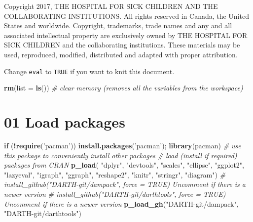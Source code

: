 \documentclass[
]{article}
\newenvironment{Shaded}{\begin{snugshade}}{\end{snugshade}}
\newcommand{\CommentTok}[1]{\textcolor[rgb]{0.56,0.35,0.01}{\textit{#1}}}
\newcommand{\ControlFlowTok}[1]{\textcolor[rgb]{0.13,0.29,0.53}{\textbf{#1}}}
\newcommand{\DataTypeTok}[1]{\textcolor[rgb]{0.13,0.29,0.53}{#1}}
\newcommand{\KeywordTok}[1]{\textcolor[rgb]{0.13,0.29,0.53}{\textbf{#1}}}
\newcommand{\NormalTok}[1]{#1}
\newcommand{\OperatorTok}[1]{\textcolor[rgb]{0.81,0.36,0.00}{\textbf{#1}}}
\newcommand{\StringTok}[1]{\textcolor[rgb]{0.31,0.60,0.02}{#1}}
\begin{document}
Copyright 2017, THE HOSPITAL FOR SICK CHILDREN AND THE COLLABORATING
INSTITUTIONS. All rights reserved in Canada, the United States and
worldwide. Copyright, trademarks, trade names and any and all associated
intellectual property are exclusively owned by THE HOSPITAL FOR SICK
CHILDREN and the collaborating institutions. These materials may be
used, reproduced, modified, distributed and adapted with proper
attribution.

\newpage

Change \texttt{eval} to \texttt{TRUE} if you want to knit this document.

\begin{Shaded}
\begin{Highlighting}[]
\KeywordTok{rm}\NormalTok{(}\DataTypeTok{list =} \KeywordTok{ls}\NormalTok{())      }\CommentTok{# clear memory (removes all the variables from the workspace)}
\end{Highlighting}
\end{Shaded}

\hypertarget{load-packages}{%
\section{01 Load packages}\label{load-packages}}

\begin{Shaded}
\begin{Highlighting}[]
\ControlFlowTok{if}\NormalTok{ (}\OperatorTok{!}\KeywordTok{require}\NormalTok{(}\StringTok{'pacman'}\NormalTok{)) }\KeywordTok{install.packages}\NormalTok{(}\StringTok{'pacman'}\NormalTok{); }\KeywordTok{library}\NormalTok{(pacman) }\CommentTok{# use this package to conveniently install other packages}
\CommentTok{# load (install if required) packages from CRAN}
\KeywordTok{p_load}\NormalTok{( }\StringTok{"dplyr"}\NormalTok{, }\StringTok{"devtools"}\NormalTok{, }\StringTok{"scales"}\NormalTok{, }\StringTok{"ellipse"}\NormalTok{, }\StringTok{"ggplot2"}\NormalTok{, }\StringTok{"lazyeval"}\NormalTok{, }\StringTok{"igraph"}\NormalTok{, }\StringTok{"ggraph"}\NormalTok{, }\StringTok{"reshape2"}\NormalTok{, }\StringTok{"knitr"}\NormalTok{, }\StringTok{"stringr"}\NormalTok{, }\StringTok{"diagram"}\NormalTok{)   }
\CommentTok{# install_github("DARTH-git/dampack", force = TRUE) Uncomment if there is a newer version}
\CommentTok{# install_github("DARTH-git/darthtools", force = TRUE) Uncomment if there is a newer version}
\KeywordTok{p_load_gh}\NormalTok{(}\StringTok{"DARTH-git/dampack"}\NormalTok{, }\StringTok{"DARTH-git/darthtools"}\NormalTok{)}
\end{Highlighting}
\end{Shaded}
\end{document}
